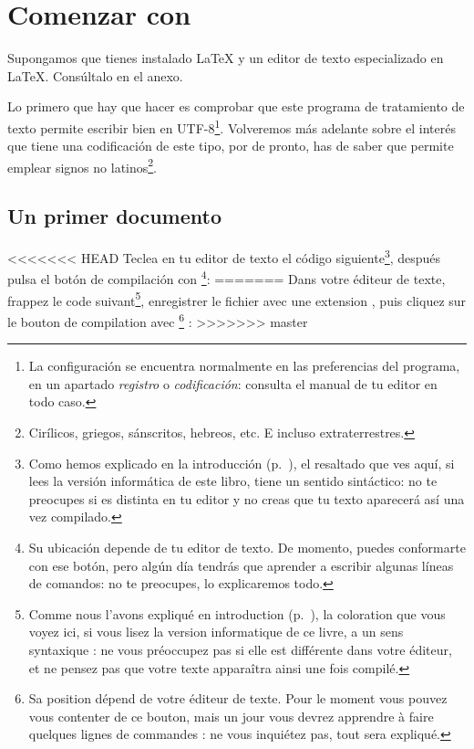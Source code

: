 \chapter[Comenzar con XeLaTeX]{Comenzar con \XeLaTeX}\label{commencer}

\begin{intro}
Supongamos que tienes instalado \LaTeX{} y un editor de texto especializado en \LaTeX. Consúltalo en el anexo. 

Lo primero que hay que hacer es comprobar que este programa de tratamiento de texto permite escribir bien en UTF-8\footnote{La configuración se encuentra normalmente en las preferencias del programa, en un apartado \emph{registro} o \emph{codificación}: consulta el manual de tu editor en todo caso.}. Volveremos más adelante sobre el interés que tiene una codificación de este tipo, por de pronto, has de saber que permite emplear signos no latinos\footnote{Cirílicos, griegos, sánscritos, hebreos, etc. E incluso extraterrestres.}.

\end{intro}

\section{Un primer documento}

<<<<<<< HEAD
Teclea en tu editor de texto el código siguiente\footnote{Como hemos explicado en la introducción (p.~\pageref{colorationsyntax}), el resaltado que ves aquí, si lees la versión informática de este libro, tiene un sentido sintáctico: no te preocupes si es distinta en tu editor y no creas que tu texto aparecerá así una vez compilado.}, después pulsa el botón de compilación con \XeLaTeX \footnote{Su ubicación depende de tu editor de texto. De momento, puedes conformarte con ese botón, pero algún día tendrás que aprender a escribir algunas líneas de comandos: no te preocupes, lo explicaremos todo.}:
=======
Dans votre éditeur de texte, frappez le code suivant\footnote{Comme nous l'avons expliqué en introduction (p.~\pageref{colorationsyntax}), la coloration que vous voyez ici, si vous lisez la version informatique de ce livre, a un sens syntaxique : ne vous préoccupez pas si elle est différente dans votre éditeur, et ne pensez pas que votre texte apparaîtra ainsi une fois compilé.}, enregistrer le fichier avec une extension , puis cliquez sur le bouton de compilation avec \XeLaTeX \footnote{Sa position dépend de votre éditeur de texte. Pour le moment vous pouvez vous contenter de ce bouton, mais un jour vous devrez apprendre à faire quelques lignes de commandes : ne vous inquiétez pas, tout sera expliqué.} :
>>>>>>> master

